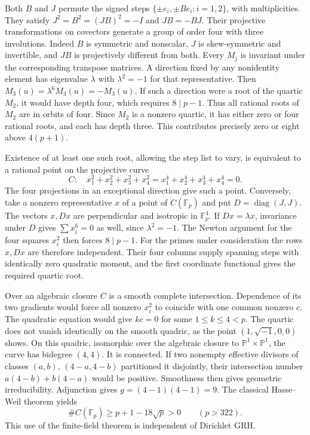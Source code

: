 Both $B$ and $J$ permute the signed steps $\{\pm e_i,\pm Be_i:i=1,2\}$, with multiplicities. They satisfy $J^2=B^2=(JB)^2=-I$ and $JB=-BJ$. Their projective transformations on covectors generate a group of order four with three involutions. Indeed $B$ is symmetric and nonscalar, $J$ is skew-symmetric and invertible, and $JB$ is projectively different from both. Every $M_j$ is invariant under the corresponding transpose matrices. A direction fixed by any nonidentity element has eigenvalue $\lambda$ with $\lambda^2=-1$ for that representative. Then $M_3(u)=\lambda^6M_3(u)=-M_3(u)$. If such a direction were a root of the quartic $M_2$, it would have depth four, which requires $8\mid p-1$. Thus all rational roots of $M_2$ are in orbits of four. Since $M_2$ is a nonzero quartic, it has either zero or four rational roots, and each has depth three. This contributes precisely zero or eight above $4(p+1)$.

Existence of at least one such root, allowing the step list to vary, is equivalent to a rational point on the projective curve
\[
 C:\quad x_1^2+x_2^2+x_3^2+x_4^2
       =x_1^4+x_2^4+x_3^4+x_4^4=0 .
\]
The four projections in an exceptional direction give such a point. Conversely, take a nonzero representative $x$ of a point of $C(\mathbb F_p)$ and put $D=\operatorname{diag}(J,J)$. The vectors $x,Dx$ are perpendicular and isotropic in $\mathbb F_p^4$. If $Dx=\lambda x$, invariance under $D$ gives $\sum x_i^6=0$ as well, since $\lambda^2=-1$. The Newton argument for the four squares $x_i^2$ then forces $8\mid p-1$. For the primes under consideration the rows $x,Dx$ are therefore independent. Their four columns supply spanning steps with identically zero quadratic moment, and the first coordinate functional gives the required quartic root.

Over an algebraic closure $C$ is a smooth complete intersection. Dependence of its two gradients would force all nonzero $x_i^2$ to coincide with one common nonzero $c$. The quadratic equation would give $kc=0$ for some $1\le k\le4<p$. The quartic does not vanish identically on the smooth quadric, as the point $(1,\sqrt{-1},0,0)$ shows. On this quadric, isomorphic over the algebraic closure to $\mathbb P^1\times\mathbb P^1$, the curve has bidegree $(4,4)$. It is connected. If two nonempty effective divisors of classes $(a,b)$, $(4-a,4-b)$ partitioned it disjointly, their intersection number $a(4-b)+b(4-a)$ would be positive. Smoothness then gives geometric irreducibility. Adjunction gives $g=(4-1)(4-1)=9$. The classical Hasse--Weil theorem \cite{weil} yields
\[
 \#C(\mathbb F_p)\ge p+1-18\sqrt p>0\qquad (p>322).
\]
This use of the finite-field theorem is independent of Dirichlet GRH.

